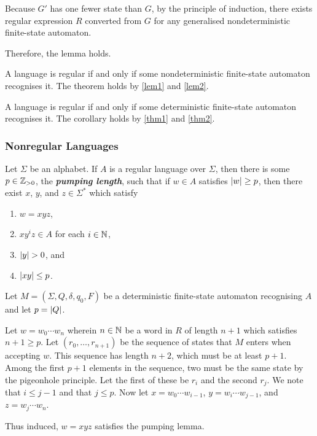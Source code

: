  Because \(G'\) has one fewer state than \(G\), by the principle of induction, there exists regular expression \(R\)
  converted from \(G\) for any generalised nondeterministic finite-state automaton.

  Therefore, the lemma holds.
\Epr

\Bth
  \label{thm2}
  A language is regular if and only if some nondeterministic finite-state automaton recognises it.
\Eth
\Bpr
  The theorem holds by \autoref{lem1} and \autoref{lem2}.
\Epr

\Bcr
  A language is regular if and only if some deterministic finite-state automaton recognises it.
\Ecr
\Bpr
  The corollary holds by \autoref{thm1} and \autoref{thm2}.
\Epr

\subsubsection{Nonregular Languages}

  Let \(\Sigma\) be an alphabet. If \(A\) is a regular language over \(\Sigma\), then there is some \(p \in \mathbb{Z}_{>0}\),
  the \textbf{\textit{pumping length}}, such that if \(w \in A\) satisfies \(\lvert w\rvert \geq p\), then there exist \(x\),
  \(y\), and \(z \in \Sigma^*\) which satisfy
  \begin{enumerate}
    \item \(w = x y z\),
    \item \(x y^i z \in A\) for each \(i \in \mathbb{N}\),
    \item \(\lvert y\rvert > 0\), and
    \item \(\lvert x y \rvert \leq p\).
  \end{enumerate}
\Eth
\Bpr
  Let \(M = (\Sigma, Q, \delta, q_0, F)\) be a deterministic finite-state automaton recognising \(A\) and let
  \(p = \lvert Q\rvert\).

  Let \(w = w_0 \cdots w_n\) wherein \(n \in \mathbb{N}\) be a word in \(R\) of length \(n + 1\) which satisfies \(n + 1
  \geq p\). Let \((r_0, \ldots, r_{n + 1})\) be the sequence of states that \(M\) enters when accepting \(w\). This
  sequence has length \(n + 2\), which must be at least \(p + 1\). Among the first \(p + 1\) elements in the sequence,
  two must be the same state by the pigeonhole principle. Let the first of these be \(r_i\) and the second \(r_j\). We
  note that \(i \leq j - 1\) and that \(j \leq p\). Now let \(x = w_0 \cdots w_{i - 1}\), \(y = w_i \cdots w_{j - 1}\),
  and \(z = w_j \cdots w_n\).

  Thus induced, \(w = x y z\) satisfies the pumping lemma.
\Epr

